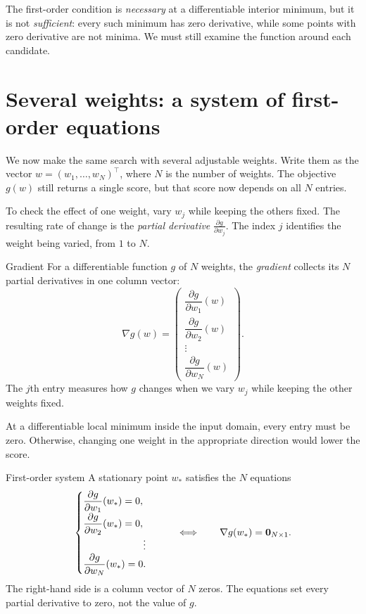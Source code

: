 \documentclass[a4paper,12pt,oneside]{report}
\begin{document}
The first-order condition is \emph{necessary} at a differentiable
interior minimum, but it is not \emph{sufficient}: every such minimum
has zero derivative, while some points with zero derivative are not
minima. We must still examine the function around each candidate.

\clearpage
\section{Several weights: a system of first-order equations}

We now make the same search with several adjustable weights.
Write them as the vector $w=(w_1,\ldots,w_N)^\top$, where $N$ is
the number of weights. The objective $g(w)$ still returns a single
score, but that score now depends on all $N$ entries.

To check the effect of one weight, vary $w_j$ while keeping the
others fixed. The resulting rate of change is the \emph{partial
derivative} $\frac{\partial g}{\partial w_j}$. The index $j$ identifies
the weight being varied, from $1$ to $N$.

\begin{frameddefn}{Gradient}\label{def:optimization-gradient}
For a differentiable function $g$ of $N$ weights, the \emph{gradient}
collects its $N$ partial derivatives in one column vector:
\[
  \nabla g(w)=
  \begin{pmatrix}
    \dfrac{\partial g}{\partial w_1}(w)\\[4pt]
    \dfrac{\partial g}{\partial w_2}(w)\\
    \vdots\\
    \dfrac{\partial g}{\partial w_N}(w)
  \end{pmatrix}.
\]
The $j$th entry measures how $g$ changes when we vary $w_j$ while
keeping the other weights fixed.
\end{frameddefn}

At a differentiable local minimum inside the input domain, every
entry must be zero. Otherwise, changing one weight in the appropriate
direction would lower the score.

\begin{frameddefn}{First-order system}\label{def:first-order-system}
A stationary point $w_*$ satisfies the $N$ equations
\[
  \begin{cases}
    \dfrac{\partial g}{\partial w_1}(w_*)=0,\\[5pt]
    \dfrac{\partial g}{\partial w_2}(w_*)=0,\\
    \hfill\vdots\\
    \dfrac{\partial g}{\partial w_N}(w_*)=0.
  \end{cases}
  \qquad\Longleftrightarrow\qquad
  \nabla g(w_*)=\mathbf{0}_{N\times1}.
\]
The right-hand side is a column vector of $N$ zeros. The equations
set every partial derivative to zero, not the value of $g$.
\end{frameddefn}
\end{document}

